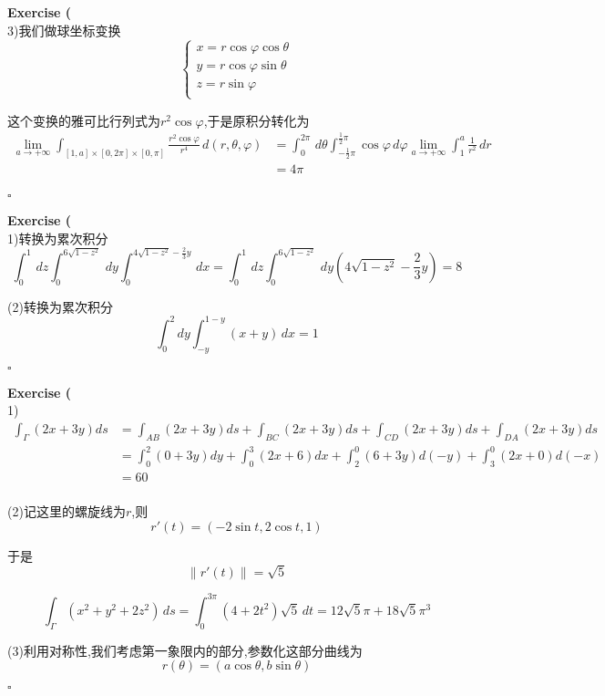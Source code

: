 \documentclass[11pt,hyperref,a4paper,UTF8]{ctexart}
\newenvironment{exercise}[1]{%
{\textbf{Exercise #1} \\ 
    }
}{
  \hfill $\square$ 
  \par\bigskip 
}
\newcommand{\parameter}[1]{\left(#1\right)}
\begin{document}
\begin{CJK}{UTF8}{gkai}
\begin{exercise}{10}
    (3)我们做球坐标变换
    \[\begin{cases}
        x = r \cos \varphi \cos \theta\\
        y = r \cos \varphi \sin \theta\\
        z = r \sin \varphi\\
      \end{cases}\]

      这个变换的雅可比行列式为$r^2 \cos \varphi$,于是原积分转化为
      \[
      \begin{aligned}
        \lim_{a \to +\infty}\int_{[1,a] \times [0,2\pi] \times[0,\pi]} \frac{r^2 \cos \varphi}{r^4}\, d(r,\theta,\varphi) &= \int_{0}^{2\pi}\, d\theta \int_{-\frac{1}{2}\pi}^{\frac{1}{2}\pi}\cos \varphi \, d\varphi \lim_{a \to +\infty}\int_{1}^{a} \frac{1}{r^2}\, dr\\
        &= 4\pi\\
      \end{aligned}  
      \]
\end{exercise}

\begin{exercise}{11}
    (1)转换为累次积分
    \[\int_{0}^{1}\,dz \int_{0}^{6\sqrt{1 - z^2}}\, dy \int_{0}^{4\sqrt{1 - z^2} - \frac{2}{3}y}\, dx = \int_{0}^{1}\,dz \int_{0}^{6\sqrt{1 - z^2}}\, dy \parameter{4\sqrt{1 - z^2} - \frac{2}{3}y} = 8\]

    (2)转换为累次积分
    \[\int_{0}^{2} dy \int_{-y}^{1 - y} (x + y)\, dx = 1\]
\end{exercise}

\begin{exercise}{12}
    (1)
    \[
    \begin{aligned}    
        \int_{\Gamma} (2x + 3y) ds &= \int_{AB} (2x + 3y) ds + \int_{BC} (2x + 3y) ds + \int_{CD} (2x + 3y) ds + \int_{DA} (2x + 3y) ds\\
        &= \int_{0}^2 (0 + 3y) dy + \int_{0}^3 (2x + 6) dx + \int_{2}^0 (6 + 3y) d(-y) + \int_{3}^0 (2x + 0) d(-x)\\
        &= 60\\
    \end{aligned}    
    \]

    (2)记这里的螺旋线为$r$,则
    \[r'(t) = (-2\sin t,2 \cos t, 1)\]

    于是
    \[\|r'(t)\| = \sqrt{5}\]

    \[\int_{\Gamma} (x^2 + y^2 + 2z^2)\, ds = \int_{0}^{3\pi} (4 + 2t^2) \sqrt{5}\, dt = 12\sqrt{5}\pi + 18\sqrt{5}\pi^3\]

    (3)利用对称性,我们考虑第一象限内的部分,参数化这部分曲线为
    \[r(\theta) = (a\cos \theta,b\sin \theta)\]


\end{exercise}
\end{CJK}
\end{document}
